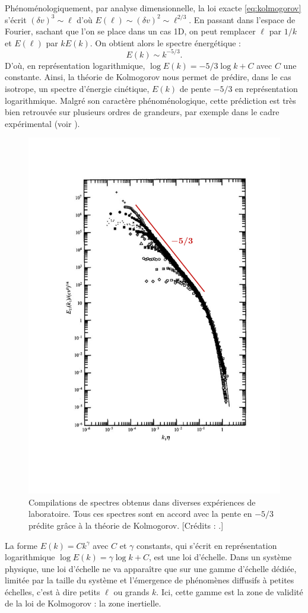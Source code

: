 Phénoménologiquement, par analyse dimensionnelle, la loi exacte \eqref{eq:kolmogorov} s'écrit $(\delta v)^3 \sim \ell$ d'où $E(\ell) \sim (\delta v)^2 \sim \ell^{2/3}$. En passant dans l'espace de Fourier, sachant que l'on se place dans un cas \acs{1D}, on peut remplacer $\ell$ par $1/k$ et $E(\ell)$ par $k E(k)$. On obtient alors le spectre énergétique :
\begin{equation}
    E(k) \sim k^{-5/3}.
\end{equation} 
D'où, en représentation logarithmique, $\log E(k) = -5/3 \log k + C $ avec $C$ une constante. Ainsi, la théorie de Kolmogorov nous permet de prédire, dans le cas isotrope, un spectre d'énergie cinétique, $E(k)$ de pente $-5/3$ en représentation logarithmique. Malgré son caractère phénoménologique, cette prédiction est très bien retrouvée sur plusieurs ordres de grandeurs, par exemple dans le cadre expérimental (voir  ). 
\begin{figure}[!ht]
 \centering
\includegraphics[width=0.8\linewidth,trim=1cm 4cm 1cm 3cm, clip=true]{./Part_0/images/spectre_kolmogorov}
\cprotect\caption{Compilations de spectres obtenus dans diverses expériences de laboratoire. Tous ces spectres sont en accord avec la pente en $-5/3$ prédite grâce à la théorie de Kolmogorov. [Crédits : \cite{saddoughi_local_1994}.] }
\label{fig:spec_kolmo}
\end{figure}
La forme $E(k) = C k^{\gamma}$ avec $C$ et $\gamma$ constants, qui s'écrit  en représentation logarithmique $\log E(k) = \gamma \log k + C $, est une loi d'échelle. Dans un système physique, une loi d'échelle ne va apparaître que sur une gamme d'échelle dédiée, limitée par la taille du système et l'émergence de phénomènes diffusifs à petites échelles, c'est à dire petits $\ell$ ou grands $k$. Ici, cette gamme est la zone de validité de la loi de Kolmogorov : la zone inertielle. 

